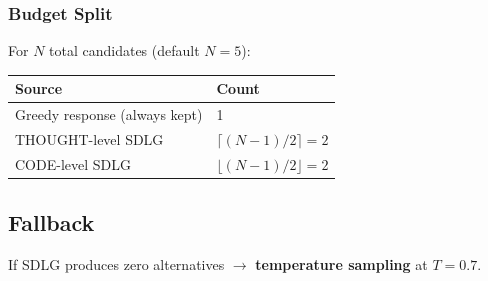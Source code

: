 \documentclass[10pt,a4paper,twocolumn]{article}
\begin{document}
\subsubsection{Budget Split}

For $N$ total candidates (default $N{=}5$):

\begin{small}
\begin{tabular}{@{}ll@{}}
\toprule
\textbf{Source} & \textbf{Count} \\
\midrule
Greedy response (always kept) & 1 \\
THOUGHT-level SDLG & $\lceil(N{-}1)/2\rceil = 2$ \\
CODE-level SDLG & $\lfloor(N{-}1)/2\rfloor = 2$ \\
\bottomrule
\end{tabular}
\end{small}

\subsection{Fallback}

If SDLG produces zero alternatives $\to$ \textbf{temperature sampling} at $T{=}0.7$.
\end{document}
